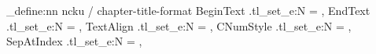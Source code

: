 \newcommand\SetupTitleNumberFormatString[3]
{%
  \NCKUPrivateSetRemainingNumberingKeys{SetupTitleNumberFormatString}{#2}%
  \renewcommand#3{}%
  \NCKUPrivateAppendFrozenValue{#3}{\TmpValueBeginText}%
  \ifboolexpr{%
    test {\ifstrequal{#1}{Chapter}} or %
    test {\ifstrequal{#1}{AppendixChapter}} }
      {%
        \AppendCounterStringToFormatString{%
          #3}{\TmpValueCNumStyle}{\TmpValueCCounterName}%
      }{}%
  \ifboolexpr{%
    test {\ifstrequal{#1}{Section}} or %
    test {\ifstrequal{#1}{AppendixSection}} }
      {%
        \AppendCounterStringToFormatString{%
          #3}{\TmpValueCNumStyle}{\TmpValueCCounterName}%
        \NCKUPrivateAppendFrozenValue{#3}{\TmpValueSepBetweenCnS}%
        \AppendCounterStringToFormatString{%
          #3}{\TmpValueSNumStyle}{\TmpValueSCounterName}%
      }{}%
  \ifboolexpr{%
    test {\ifstrequal{#1}{SubSection}} or %
    test {\ifstrequal{#1}{AppendixSubSection}} }
      {%
        \AppendCounterStringToFormatString{%
          #3}{\TmpValueCNumStyle}{\TmpValueCCounterName}%
        \NCKUPrivateAppendFrozenValue{#3}{\TmpValueSepBetweenCnS}%
        \AppendCounterStringToFormatString{%
          #3}{\TmpValueSNumStyle}{\TmpValueSCounterName}%
        \NCKUPrivateAppendFrozenValue{#3}{\TmpValueSepBetweenSnSS}%
        \AppendCounterStringToFormatString{%
          #3}{\TmpValueSSNumStyle}{\TmpValueSSCounterName}%
      }{}%
  \ifboolexpr{%
    test {\ifstrequal{#1}{SubSubSection}} or %
    test {\ifstrequal{#1}{AppendixSubSubSection}} }
      {%
        \AppendCounterStringToFormatString{%
          #3}{\TmpValueCNumStyle}{\TmpValueCCounterName}%
        \NCKUPrivateAppendFrozenValue{#3}{\TmpValueSepBetweenCnS}%
        \AppendCounterStringToFormatString{%
          #3}{\TmpValueSNumStyle}{\TmpValueSCounterName}%
        \NCKUPrivateAppendFrozenValue{#3}{\TmpValueSepBetweenSnSS}%
        \AppendCounterStringToFormatString{%
          #3}{\TmpValueSSNumStyle}{\TmpValueSSCounterName}%
        \NCKUPrivateAppendFrozenValue{#3}{\TmpValueSepBetweenSSCnSSS}%
        \AppendCounterStringToFormatString{%
          #3}{\TmpValueSSSNumStyle}{\TmpValueSSSCounterName}%
      }{}%
  \NCKUPrivateAppendFrozenValue{#3}{\TmpValueEndText}%
} %


\ExplSyntaxOn
\keys_define:nn { ncku / chapter-title-format }
  {
    BeginText  .tl_set_e:N = \GetCTitleNumberFormatBeginText,
    EndText    .tl_set_e:N = \GetCTitleNumberFormatEndText,
    TextAlign  .tl_set_e:N = \GetCTitleNumberFormatTextAlign,
    CNumStyle  .tl_set_e:N = \GetCTitleNumberFormatCNumStyle,
    SepAtIndex .tl_set_e:N = \GetCTitleNumberFormatSepAtIndex,
  }

